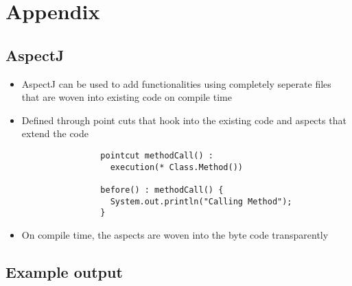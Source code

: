 \section{Appendix}
\subsection{AspectJ} \label{sec:aspectj}
	\begin{itemize}
		\item AspectJ can be used to add functionalities using completely
			seperate files that are woven into existing code on compile time
		\item Defined through point cuts that hook into the existing code and aspects that
			extend the code
	
			\begin{verbatim}
				pointcut methodCall() :
				  execution(* Class.Method())
				  
				before() : methodCall() {
				  System.out.println("Calling Method");
				}
			\end{verbatim}
		
		\item On compile time, the aspects are woven into the byte code transparently
		
	\end{itemize}
	
\subsection{Example output} \label{sec:exampleOutput}
	